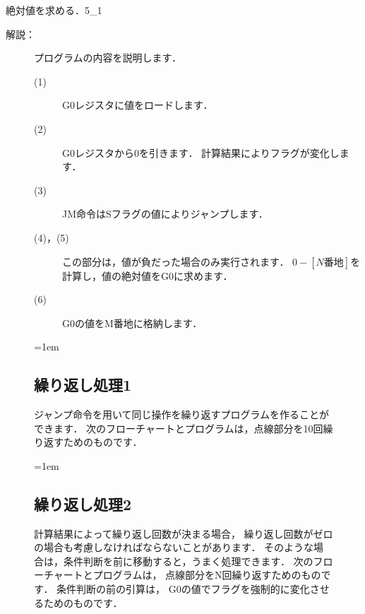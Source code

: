 \begin{reidai}{絶対値を求める．}{5_1}
\begin{description}
  \item[解説：]プログラムの内容を説明します．
    {\small
      \begin{description}
      \item[(1)] G0レジスタに値をロードします．
      \item[(2)] G0レジスタから0を引きます．
        計算結果によりフラグが変化します．
      \item[(3)] JM命令はSフラグの値によりジャンプします．
      \item[(4)，(5)] この部分は，値が負だった場合のみ実行されます．
        $0 - [N番地]$を計算し，値の絶対値をG0に求めます．
      \item[(6)] G0の値をM番地に格納します．
      \end{description}
    }

  \end{description}
\end{reidai}

\begin{figure}[btp]
  \begin{framed}{\parindent=1em
      \subsection*{繰り返し処理1}
      ジャンプ命令を用いて同じ操作を繰り返すプログラムを作ることができます．
      次のフローチャートとプログラムは，点線部分を10回繰り返すためのものです．

      \begin{center}
      \end{center}
  }\end{framed}
\end{figure}

\begin{figure}[btp]
  \begin{framed}{\parindent=1em
      \subsection*{繰り返し処理2}
      計算結果によって繰り返し回数が決まる場合，
      繰り返し回数がゼロの場合も考慮しなければならないことがあります．
      そのような場合は，条件判断を前に移動すると，うまく処理できます．
      次のフローチャートとプログラムは，
      点線部分をN回繰り返すためのものです．
      条件判断の前の引算は，
      G0の値でフラグを強制的に変化させるためのものです．

      \begin{center}
      \end{center}
  }\end{framed}
\end{figure}

